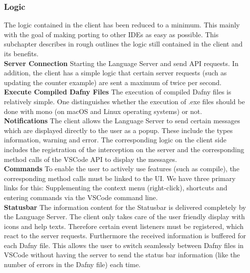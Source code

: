 \subsubsection{Logic}
The logic contained in the client has been reduced to a minimum.
This mainly with the goal of making porting to other IDEs as easy as possible.
This subchapter describes in rough outlines the logic still contained in the client and its benefits.  \\

{\bf Server Connection} \textendash{}
Starting the Language Server and send API requests. In addition, the client has a simple logic that
certain server requests (such as updating the counter example) are sent a maximum of twice per second. \\

{\bf Execute Compiled Dafny Files} \textendash{}
The execution of compiled Dafny files is relatively simple. One distinguishes whether the execution
of .exe files should be done with mono (on macOS and Linux operating systems) or not. \\

{\bf Notifications} \textendash{}
The client allows the Language Server to send certain messages which are displayed directly to the user as a popup.
These include the types information, warning and error.
The corresponding logic on the client side includes the registration of the interception on the server
and the corresponding method calls of the VSCode API to display the messages. \\

{\bf Commands} \textendash{}
To enable the user to actively use features (such as compile),
the corresponding method calls must be linked to the UI.
We have three primary links for this: Supplementing the context menu (right-click),
shortcuts and entering commands via the VSCode command line. \\

{\bf Statusbar} \textendash{}
The information content for the Statusbar is delivered completely by the Language Server.
The client only takes care of the user friendly display with icons and help texts.
Therefore certain event listeners must be registered, which react to the server requests.
Furthermore the received information is buffered for each Dafny file.
This allows the user to switch seamlessly between Dafny files in VSCode
without having the server to send the status bar information
(like the number of errors in the Dafny file) each time.  \\

